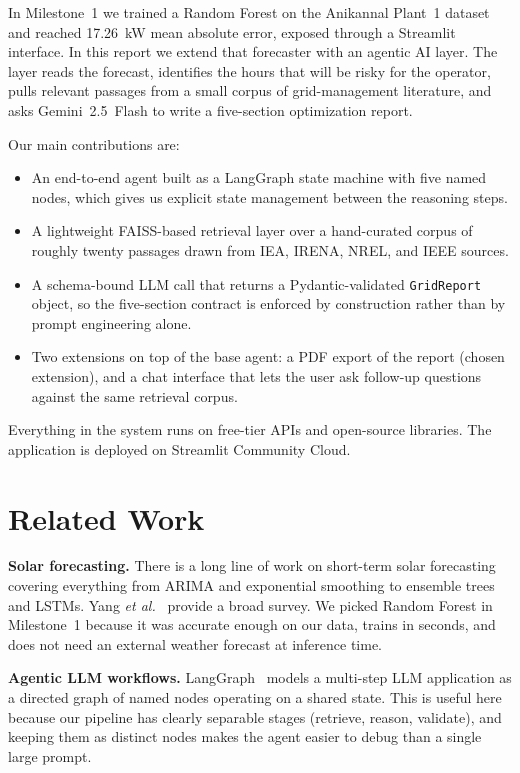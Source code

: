\documentclass[journal,onecolumn,11pt]{IEEEtran}
\begin{document}
In Milestone~1 we trained a Random Forest on the Anikannal Plant~1 dataset and reached 17.26~kW mean absolute error, exposed through a Streamlit interface. In this report we extend that forecaster with an agentic AI layer. The layer reads the forecast, identifies the hours that will be risky for the operator, pulls relevant passages from a small corpus of grid-management literature, and asks Gemini~2.5~Flash to write a five-section optimization report.

Our main contributions are:
\begin{itemize}
  \item An end-to-end agent built as a LangGraph state machine with five named nodes, which gives us explicit state management between the reasoning steps.
  \item A lightweight FAISS-based retrieval layer over a hand-curated corpus of roughly twenty passages drawn from IEA, IRENA, NREL, and IEEE sources.
  \item A schema-bound LLM call that returns a Pydantic-validated \texttt{GridReport} object, so the five-section contract is enforced by construction rather than by prompt engineering alone.
  \item Two extensions on top of the base agent: a PDF export of the report (chosen extension), and a chat interface that lets the user ask follow-up questions against the same retrieval corpus.
\end{itemize}

Everything in the system runs on free-tier APIs and open-source libraries. The application is deployed on Streamlit Community Cloud.

\section{Related Work}

\textbf{Solar forecasting.} There is a long line of work on short-term solar forecasting covering everything from ARIMA and exponential smoothing to ensemble trees and LSTMs. Yang \emph{et al.}~\citep{yang2018history} provide a broad survey. We picked Random Forest in Milestone~1 because it was accurate enough on our data, trains in seconds, and does not need an external weather forecast at inference time.

\textbf{Agentic LLM workflows.} LangGraph~\citep{langgraph} models a multi-step LLM application as a directed graph of named nodes operating on a shared state. This is useful here because our pipeline has clearly separable stages (retrieve, reason, validate), and keeping them as distinct nodes makes the agent easier to debug than a single large prompt.
\end{document}
